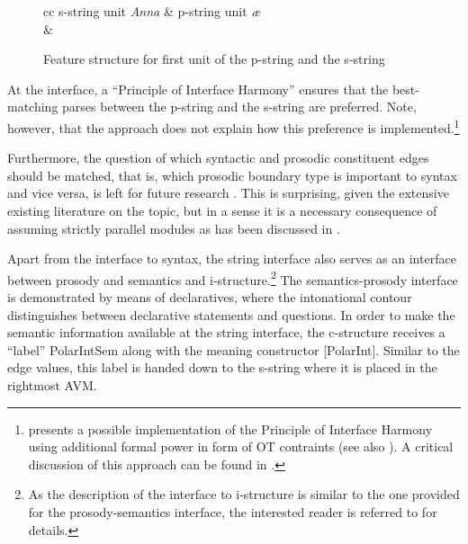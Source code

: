 \documentclass[output=paper,hidelinks]{langscibook}
\begin{document}
\begin{figure}
\begin{tabular}{cc}
  s-string unit {\em Anna} & p-string unit {\em\ae}\\
\avm[style=fstr]{
[ fm & Anna \\
 L & \{ IP, NP, N \} \\
 R & \{ NP, N \} \\
]
}
&
\end{tabular}
\caption{Feature structure for first unit of the p-string and the s-string \citep[][412]{DLM:LFG}}
\label{fig:avmsAnna}
\end{figure}

\noindent
At the interface, a ``Principle of Interface Harmony'' ensures that the best-match\-ing parses between the p-string and the s-string are preferred. Note, however, that the approach does not explain how this preference is implemented.\footnote{\citet{lowe:16a} presents a possible implementation of the Principle of Interface Harmony using additional formal power in form of OT contraints (see also \citealt{LoweBelyaev2015}). A critical discussion of this approach can be found in \citet[][Ch.6]{Boegel2015}.}

Furthermore, the question of which syntactic and prosodic constituent edges should be matched, that is, which prosodic boundary type is important to syntax and vice versa, is left for future research \citep[][419]{DLM:LFG}. This is surprising, given the extensive existing literature on the topic, but in a sense it is a necessary consequence of assuming strictly parallel modules as has been discussed in .

Apart from the interface to syntax, the string interface also serves as an interface between prosody and semantics and i-structure.\footnote{As the description of the interface to i-structure is similar to the one provided for the prosody-semantics interface, the interested reader is referred to \citet{DLM:LFG} for details.} The semantics-prosody interface is demonstrated by means of declaratives, where the intonational contour distinguishes between declarative statements and questions. In order to make the semantic information available at the string interface, the c-structure receives a ``label'' PolarIntSem along with the meaning constructor [PolarInt]. Similar to the edge values, this label is handed down to the s-string where it is placed in the rightmost AVM.
\end{document}
